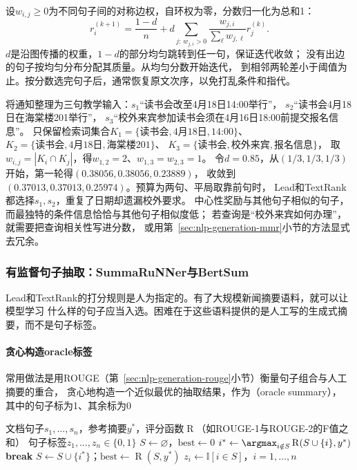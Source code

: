 设$w_{i,j}\geq0$为不同句子间的对称边权，自环权为零，分数归一化为总和1：
\begin{equation}
  r_i^{(k+1)}
  =\frac{1-d}{n}
   +d\sum_{j:\,w_{j,i}>0}
   \frac{w_{j,i}}{\sum_\ell w_{j,\ell}}r_j^{(k)}.
  \label{eq:nlp-generation-textrank}
\end{equation}
$d$是沿图传播的权重，$1-d$的部分均匀跳转到任一句，保证迭代收敛；
没有出边的句子按均匀分布分配其质量。从均匀分数开始迭代，
到相邻两轮差小于阈值为止。按分数选完句子后，通常恢复原文次序，以免打乱条件和指代。

将通知整理为三句教学输入：$s_1$“读书会改至4月18日14:00举行”，
$s_2$“读书会4月18日在海棠楼201举行”，
$s_3$“校外来宾参加读书会须在4月16日18:00前提交报名信息”。
只保留检索词集合$K_1=\{\text{读书会},\text{4月18日},\text{14:00}\}$、
$K_2=\{\text{读书会},\text{4月18日},\text{海棠楼201}\}$、
$K_3=\{\text{读书会},\text{校外来宾},\text{报名信息}\}$，
取$w_{i,j}=|K_i\cap K_j|$，得$w_{1,2}=2$、$w_{1,3}=w_{2,3}=1$。
令$d=0.85$，从$(1/3,1/3,1/3)$开始，第一轮得$(0.38056,0.38056,0.23889)$，
收敛到$(0.37013,0.37013,0.25974)$。预算为两句、平局取靠前句时，
Lead和TextRank都选择$s_1,s_2$，重复了日期却遗漏校外要求。
中心性奖励与其他句子相似的句子，而最独特的条件信息恰恰与其他句子相似度低；
若查询是“校外来宾如何办理”，就需要把查询相关性写进分数，
或用第~\ref{sec:nlp-generation-mmr}小节的方法显式去冗余。

\subsubsection{有监督句子抽取：SummaRuNNer与BertSum}
\label{sec:nlp-generation-supervised-extractive}

Lead和TextRank的打分规则是人为指定的。有了大规模新闻摘要语料，就可以让模型学习
什么样的句子应当入选。困难在于这些语料提供的是人工写的生成式摘要，而不是句子标签。

\paragraph{贪心构造oracle标签}
常用做法是用ROUGE（第~\ref{sec:nlp-generation-rouge}小节）衡量句子组合与人工摘要的重合，
贪心地构造一个近似最优的抽取结果，作为（oracle summary），
其中的句子标为1、其余标为0

\begin{algorithm}[贪心构造抽取式oracle标签]
  \label{alg:nlp-generation-greedy-oracle}
  \begin{algorithmic}[1]
    \Require 文档句子$s_1,\ldots,s_n$，参考摘要$y^{\ast}$，评分函数$\operatorname{R}$（如ROUGE-1与ROUGE-2的F值之和）
    \Ensure 句子标签$z_1,\ldots,z_n\in\{0,1\}$
    \State $S\gets\varnothing$，$\mathrm{best}\gets0$
    \Loop
      \State $i^{\ast}\gets\argmax_{i\notin S}\operatorname{R}(S\cup\{i\},y^{\ast})$
        \State \textbf{break}
      \EndIf
      \State $S\gets S\cup\{i^{\ast}\}$；$\mathrm{best}\gets\operatorname{R}(S,y^{\ast})$
    \EndLoop
    \State $z_i\gets\mathbb{I}[i\in S]$，$i=1,\ldots,n$
  \end{algorithmic}
\end{algorithm}


